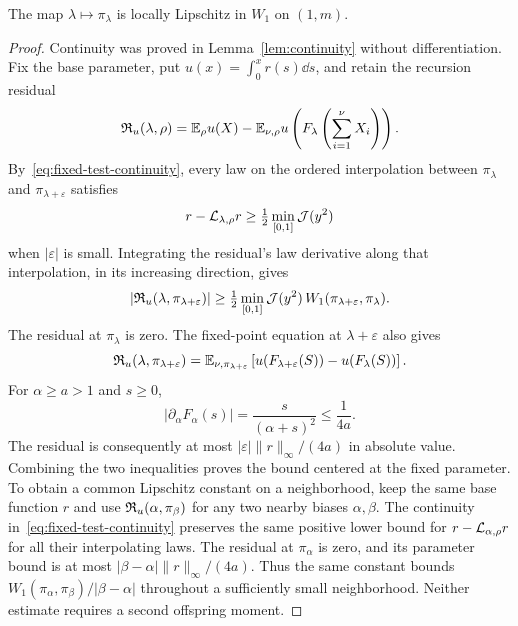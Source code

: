 \begin{lemma}\label{lem:law-lipschitz}
The map $\lambda\mapsto\pi_\lambda$ is locally Lipschitz in $W_1$ on $(1,m)$.
\end{lemma}
\begin{proof}
Continuity was proved in Lemma~\ref{lem:continuity} without differentiation. Fix the base parameter, put $u(x)=\int_0^x r(s)\dd s$, and retain the recursion residual
\[
 \mathfrak R_u(\lambda,\rho)=\mathbb E_\rho u(X)
 -\mathbb E_{\nu,\rho}u\left(F_\lambda\left(\sum_{i=1}^{\nu}X_i\right)\right).
\]
By~\eqref{eq:fixed-test-continuity}, every law on the ordered interpolation between $\pi_\lambda$ and $\pi_{\lambda+\varepsilon}$ satisfies
\[
 r-\mathcal L_{\lambda,\rho}r\ge\tfrac12\min_{[0,1]}\mathcal J(y^2)
\]
when $|\varepsilon|$ is small. Integrating the residual's law derivative along that interpolation, in its increasing direction, gives
\[
 |\mathfrak R_u(\lambda,\pi_{\lambda+\varepsilon})|
 \ge\tfrac12\min_{[0,1]}\mathcal J(y^2)\,
 W_1(\pi_{\lambda+\varepsilon},\pi_\lambda).
\]
The residual at $\pi_\lambda$ is zero. The fixed-point equation at $\lambda+\varepsilon$ also gives
\[
 \mathfrak R_u(\lambda,\pi_{\lambda+\varepsilon})
 =\mathbb E_{\nu,\pi_{\lambda+\varepsilon}}
 \left[u(F_{\lambda+\varepsilon}(S))-u(F_\lambda(S))\right].
\]
For $\alpha\ge a>1$ and $s\ge0$,
\[
 |\partial_\alpha F_\alpha(s)|=\frac{s}{(\alpha+s)^2}
 \le\frac1{4a}.
\]
The residual is consequently at most $|\varepsilon|\|r\|_\infty/(4a)$ in absolute value. Combining the two inequalities proves the bound centered at the fixed parameter. To obtain a common Lipschitz constant on a neighborhood, keep the same base function $r$ and use $\mathfrak R_u(\alpha,\pi_\beta)$ for any two nearby biases $\alpha,\beta$. The continuity in~\eqref{eq:fixed-test-continuity} preserves the same positive lower bound for $r-\mathcal L_{\alpha,\rho}r$ for all their interpolating laws. The residual at $\pi_\alpha$ is zero, and its parameter bound is at most $|\beta-\alpha|\|r\|_\infty/(4a)$. Thus the same constant bounds $W_1(\pi_\alpha,\pi_\beta)/|\beta-\alpha|$ throughout a sufficiently small neighborhood. Neither estimate requires a second offspring moment.
\end{proof}


